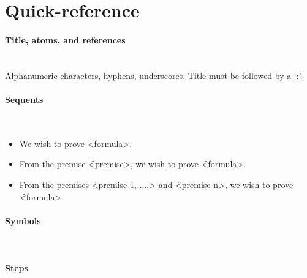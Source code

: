 \documentclass[manual.tex]{subfiles}
\begin{document}
\section{Quick-reference}\label{qr}

\paragraph{Title, atoms, and references} ~\\
Alphanumeric characters, hyphens, underscores.
Title must be followed by a `:'.

\paragraph{Sequents} ~
\begin{itemize}\itemsep0pt
\item We wish to prove \f{<formula>}.
\item From the premise \f{<premise>}, we wish to prove \f{<formula>}.
\item From the premises \f{<premise 1, ...,>} and 
        \f{<premise n>}, we wish to prove \f{<formula>}.
\end{itemize}

\paragraph{Symbols} ~
\vspace{-2mm}
\begin{figure}[H]

\end{figure}

\paragraph{Steps} ~
\vspace{-2mm}
\begin{figure}[H]
\scriptsize

\end{figure}
\end{document}
